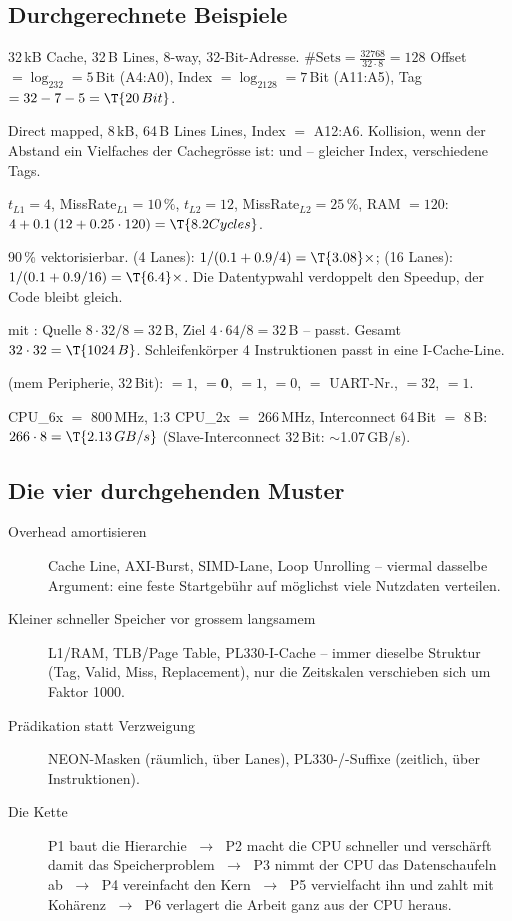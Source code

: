 \subsection{Durchgerechnete Beispiele}
\begin{bsp}
 32\,kB Cache, 32\,B Lines, 8-way, 32-Bit-Adresse.
$\#\text{Sets}=\frac{32768}{32\cdot8}=128$ \ra Offset $=\log_232=5$\,Bit
(A4:A0), Index $=\log_2128=7$\,Bit (A11:A5), Tag $=32-7-5=\T{20\,Bit}$.

 Direct mapped, 8\,kB, 64\,B Lines
 Lines, Index $=$ A12:A6. Kollision, wenn der Abstand ein
Vielfaches der Cachegrösse ist:  und  -- gleicher
Index, verschiedene Tags.

 $t_{L1}=4$, MissRate$_{L1}=10\,\%$, $t_{L2}=12$,
MissRate$_{L2}=25\,\%$, RAM $=120$:
$4+0.1\,(12+0.25\cdot120)=\T{8.2 Cycles}$.

 90\,\% vektorisierbar.
 (4 Lanes): $1/(0.1+0.9/4)=\T{3.08}\times$;
 (16 Lanes): $1/(0.1+0.9/16)=\T{6.4}\times$.
\ra Die Datentypwahl verdoppelt den Speedup, der Code bleibt gleich.

  mit : Quelle
$8\cdot32/8=32$\,B, Ziel $4\cdot64/8=32$\,B -- passt. Gesamt
$32\cdot32=\T{1024\,B}$. Schleifenkörper 4 Instruktionen \ra passt in
eine I-Cache-Line.

 (mem\,\ra\,Peripherie, 32\,Bit):
$=1$, $=\mathbf{0}$, $=1$,
$=0$, $=$ UART-Nr., $=32$, $=1$.

 CPU\_6x $=$ 800\,MHz, 1:3 \ra CPU\_2x $=$
266\,MHz, Interconnect 64\,Bit $=$ 8\,B: $266\cdot8=\T{2.13\,GB/s}$
(Slave-Interconnect 32\,Bit: $\sim$1.07\,GB/s).
\end{bsp}

\subsection{Die vier durchgehenden Muster}
\begin{description}
\item[Overhead amortisieren] Cache Line, AXI-Burst, SIMD-Lane, Loop
  Unrolling -- viermal dasselbe Argument: eine feste Startgebühr auf
  möglichst viele Nutzdaten verteilen.
\item[Kleiner schneller Speicher vor grossem langsamem] L1/RAM,
  TLB/Page Table, PL330-I-Cache -- immer dieselbe Struktur (Tag, Valid,
  Miss, Replacement), nur die Zeitskalen verschieben sich um Faktor 1000.
\item[Prädikation statt Verzweigung] NEON-Masken (räumlich, über Lanes),
  PL330-/-Suffixe (zeitlich, über Instruktionen).
\item[Die Kette] P1 baut die Hierarchie $\;\to\;$ P2 macht die CPU
  schneller und verschärft damit das Speicherproblem $\;\to\;$ P3 nimmt
  der CPU das Datenschaufeln ab $\;\to\;$ P4 vereinfacht den Kern
  $\;\to\;$ P5 vervielfacht ihn und zahlt mit Kohärenz $\;\to\;$ P6
  verlagert die Arbeit ganz aus der CPU heraus.
\end{description}
